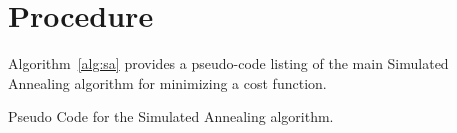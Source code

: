 \documentclass[a4paper, 11pt]{article}
\begin{document}
\section{Procedure}
\label{sec:procedure}
Algorithm~\ref{alg:sa} provides a pseudo-code listing of the main Simulated Annealing algorithm for minimizing a cost function.

\begin{algorithm}[ht]
	\SetLine  

	
	\KwIn{\ProblemSize}		
	\KwOut{\Best}
	
	\While{$\neg$\StopCondition{}} {
		
	}
	\Return{\Best}\;
	\caption{Pseudo Code for the Simulated Annealing algorithm.}
	\label{alg:sa}
\end{algorithm}

\end{document}
